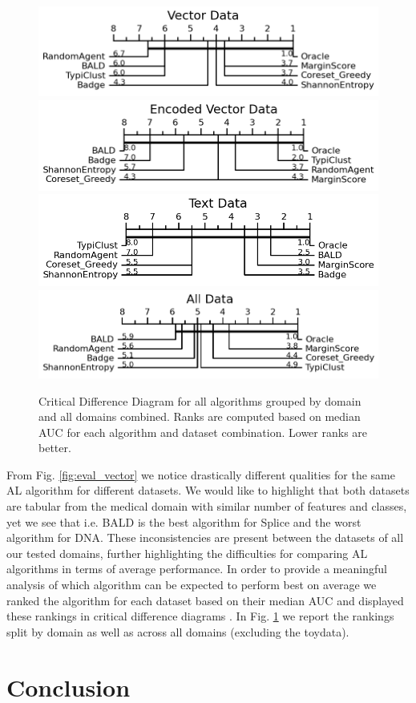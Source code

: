 \documentclass[]{article}
\begin{document}
%
\begin{figure}
\centering
	\includegraphics[width=0.49\linewidth]{img/vector.png}
	\includegraphics[width=0.49\linewidth]{img/vector_enc.png}
	\includegraphics[width=0.49\linewidth]{img/text.png}
	\includegraphics[width=0.49\linewidth]{img/all_data.png}
	\caption{Critical Difference Diagram for all algorithms grouped by domain and all domains combined. Ranks are computed based on median AUC for each algorithm and dataset combination. Lower ranks are better.}
	\label{fig:cd_diagrams}
\end{figure}
%
From Fig. \ref{fig:eval_vector} we notice drastically different qualities for the same AL algorithm for different datasets.
We would like to highlight that both datasets are tabular from the medical domain with similar number of features and classes, yet we see that i.e. BALD is the best algorithm for Splice and the worst algorithm for DNA.
These inconsistencies are present between the datasets of all our tested domains, further highlighting the difficulties for comparing AL algorithms in terms of average performance.
In order to provide a meaningful analysis of which algorithm can be expected to perform best on average we ranked the algorithm for each dataset based on their median AUC and displayed these rankings in critical difference diagrams \cite{IsmailFawaz2018deep}.
In Fig. \ref{fig:cd_diagrams} we report the rankings split by domain as well as across all domains (excluding the toydata).

\section{Conclusion}
\end{document}
